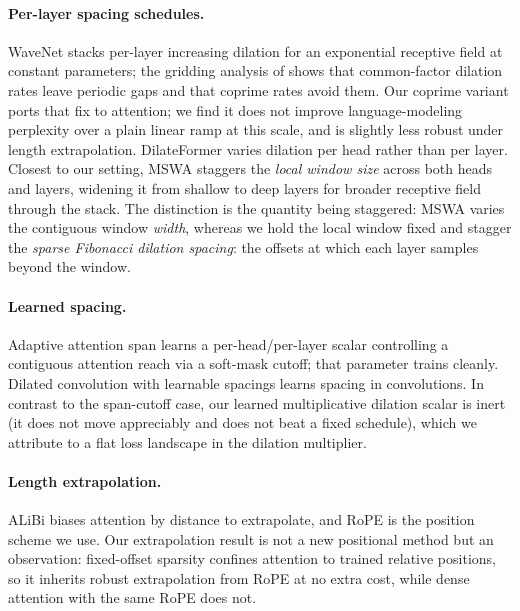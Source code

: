 \documentclass[11pt]{article}
\begin{document}
\paragraph{Per-layer spacing schedules.}
WaveNet \citep{oord2016wavenet} stacks per-layer increasing dilation for an
exponential receptive field at constant parameters; the gridding analysis of
\citet{wang2018understanding} shows that common-factor dilation rates leave
periodic gaps and that coprime rates avoid them. Our coprime variant ports that
fix to attention; we find it does not improve language-modeling perplexity over a
plain linear ramp at this scale, and is slightly less robust under length
extrapolation. DilateFormer \citep{jiao2023dilateformer} varies dilation per head
rather than per layer. Closest to our setting, MSWA \citep{xu2025mswa} staggers
the \emph{local window size} across both heads and layers, widening it from
shallow to deep layers for broader receptive field through the stack. The
distinction is the quantity being staggered: MSWA varies the contiguous window
\emph{width}, whereas we hold the local window fixed and stagger the
\emph{sparse Fibonacci dilation spacing}: the offsets at which each layer
samples beyond the window.

\paragraph{Learned spacing.}
Adaptive attention span \citep{sukhbaatar2019adaptive} learns a per-head/per-layer
scalar controlling a contiguous attention reach via a soft-mask cutoff; that
parameter trains cleanly. Dilated convolution with learnable spacings
\citep{khalfaoui2023dcls} learns spacing in convolutions. In contrast to the
span-cutoff case, our learned multiplicative dilation scalar is inert (it does
not move appreciably and does not beat a fixed schedule), which we attribute to a
flat loss landscape in the dilation multiplier.

\paragraph{Length extrapolation.}
ALiBi \citep{press2021alibi} biases attention by distance to extrapolate, and RoPE
\citep{su2021roformer} is the position scheme we use. Our extrapolation result is
not a new positional method but an observation: fixed-offset sparsity confines
attention to trained relative positions, so it inherits robust extrapolation from
RoPE at no extra cost, while dense attention with the same RoPE does not.
\end{document}
